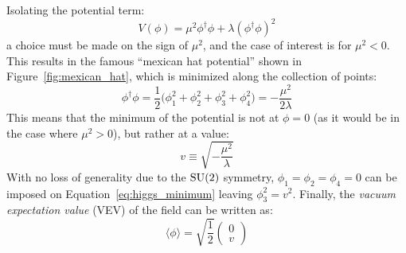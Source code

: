 Isolating the potential term:
\begin{equation}
  V(\phi) = \mu^2\phi^{\dagger}\phi+\lambda(\phi^{\dagger}\phi)^2
  \label{eq:higgs_potential}
\end{equation}
a choice must be made on the sign of $\mu^2$, and the case of interest is for $\mu^2 < 0$. %
This results in the famous ``mexican hat potential'' shown in Figure~\ref{fig:mexican_hat}, which is minimized along the collection of points:
\begin{equation}
  \phi^{\dagger}\phi = \frac{1}{2}\big(\phi_1^2 + \phi_2^2 + \phi_3^2 + \phi_4^2\big) = -\frac{\mu^2}{2\lambda}
  \label{eq:higgs_minimum}
\end{equation}
This means that the minimum of the potential is not at $\phi = 0$ (as it would be in the case where $\mu^2 > 0$), but rather at a value:
\begin{equation}
  v \equiv \sqrt{-\frac{\mu^2}{\lambda}}
  \label{eq:higgs_minimum_value}
\end{equation}
With no loss of generality due to the $\textrm{SU}(2)$ symmetry, $\phi_1 = \phi_2 = \phi_4 = 0$ can be imposed on Equation~\ref{eq:higgs_minimum} leaving $\phi_3^2 = v^2$.
Finally, the \emph{vacuum expectation value} (VEV) of the field can be written as:
\begin{equation}
  \langle\phi\rangle = \sqrt{\frac{1}{2}}
  \begin{pmatrix}
  0 \\ v
  \end{pmatrix}
  \label{eq:vev}
\end{equation}

